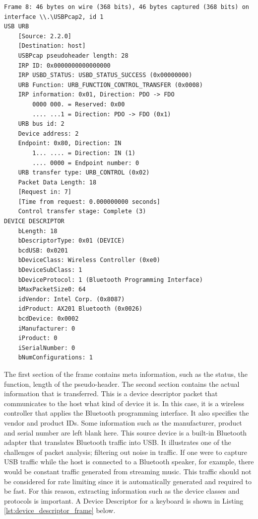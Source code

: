 \begin{lstlisting}[caption={Device Descriptor packet of a wireless controller}, label={lst:example_frame_bluetooth}, captionpos=b]
Frame 8: 46 bytes on wire (368 bits), 46 bytes captured (368 bits) on interface \\.\USBPcap2, id 1
USB URB
    [Source: 2.2.0]
    [Destination: host]
    USBPcap pseudoheader length: 28
    IRP ID: 0x0000000000000000
    IRP USBD_STATUS: USBD_STATUS_SUCCESS (0x00000000)
    URB Function: URB_FUNCTION_CONTROL_TRANSFER (0x0008)
    IRP information: 0x01, Direction: PDO -> FDO
        0000 000. = Reserved: 0x00
        .... ...1 = Direction: PDO -> FDO (0x1)
    URB bus id: 2
    Device address: 2
    Endpoint: 0x80, Direction: IN
        1... .... = Direction: IN (1)
        .... 0000 = Endpoint number: 0
    URB transfer type: URB_CONTROL (0x02)
    Packet Data Length: 18
    [Request in: 7]
    [Time from request: 0.000000000 seconds]
    Control transfer stage: Complete (3)
DEVICE DESCRIPTOR
    bLength: 18
    bDescriptorType: 0x01 (DEVICE)
    bcdUSB: 0x0201
    bDeviceClass: Wireless Controller (0xe0)
    bDeviceSubClass: 1
    bDeviceProtocol: 1 (Bluetooth Programming Interface)
    bMaxPacketSize0: 64
    idVendor: Intel Corp. (0x8087)
    idProduct: AX201 Bluetooth (0x0026)
    bcdDevice: 0x0002
    iManufacturer: 0
    iProduct: 0
    iSerialNumber: 0
    bNumConfigurations: 1
\end{lstlisting}

The first section of the frame contains meta information, such as the status, the function, length of the pseudo-header. The second section contains the actual information that is transferred.
This is a device descriptor packet that communicates to the host what kind of device it is. In this case, it is a wireless controller that applies the Bluetooth programming interface. It also specifies the
vendor and product IDs. Some information such as the manufacturer, product and serial number are left blank here.
This source device is a built-in Bluetooth adapter that translates Bluetooth traffic into USB. It illustrates one of the challenges of packet analysis; filtering out noise in traffic. If one were to capture USB traffic while the host is connected to a Bluetooth
speaker, for example, there would be constant traffic generated from streaming music. This traffic should not be considered for rate limiting since it is automatically generated and required to be fast.
For this reason, extracting information such as the device classes and protocols is important. A Device Descriptor for a keyboard is shown in Listing \ref{lst:device_descriptor_frame} below. 


